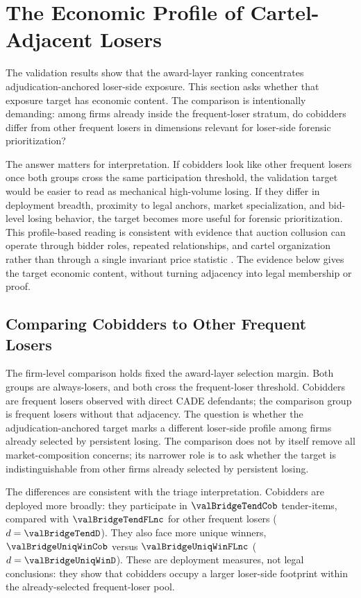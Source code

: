 \section{The Economic Profile of Cartel-Adjacent Losers}
\label{sec:cobidder_type}

The validation results show that the award-layer ranking
concentrates adjudication-anchored loser-side exposure. This
section asks whether that exposure target has economic content.
The comparison is intentionally demanding: among firms already
inside the frequent-loser stratum, do cobidders differ from
other frequent losers in dimensions relevant for loser-side
forensic prioritization?

The answer matters for interpretation. If cobidders look like
other frequent losers once both groups cross the same
participation threshold, the validation target would be easier
to read as mechanical high-volume losing. If they differ in
deployment breadth, proximity to legal anchors, market
specialization, and bid-level losing behavior, the target becomes
more useful for forensic prioritization. This profile-based
reading is consistent with evidence that auction collusion can
operate through bidder roles, repeated relationships, and cartel
organization rather than through a single invariant price
statistic
\citep{baldwin1997bidder,porter1999ohio,pesendorfer2000study,asker2010leniency,clark2021collusion}.
The evidence below gives the target economic content, without
turning adjacency into legal membership or proof.

\subsection{Comparing Cobidders to Other Frequent Losers}
\label{sec:cobidder_firm}

The firm-level comparison holds fixed the award-layer selection
margin. Both groups are always-losers, and both cross the
frequent-loser threshold. Cobidders are frequent losers observed
with direct CADE defendants; the comparison group is frequent
losers without that adjacency. The question is whether the
adjudication-anchored target marks a different loser-side
profile among firms already selected by persistent losing.
The comparison does not by itself remove all market-composition
concerns; its narrower role is to ask whether the target is
indistinguishable from other firms already selected by persistent
losing.

The differences are consistent with the triage interpretation.
Cobidders are deployed more broadly: they participate in
$\valBridgeTendCob$ tender-items, compared with
$\valBridgeTendFLnc$ for other frequent losers
($d=\valBridgeTendD$). They also face more unique winners,
$\valBridgeUniqWinCob$ versus $\valBridgeUniqWinFLnc$
($d=\valBridgeUniqWinD$). These are deployment measures, not
legal conclusions: they show that cobidders occupy a larger
loser-side footprint within the already-selected frequent-loser
pool.

